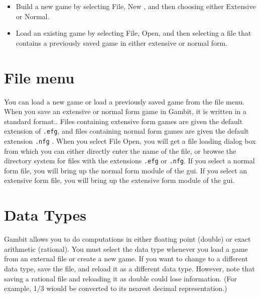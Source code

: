 \begin{itemize}
\item Build a new game by selecting File, New , and then choosing either 
Extensive or Normal.
\item  Load an existing game by selecting File, Open, and then selecting 
a file that contains a previously saved game in either extensive or normal form.
\end{itemize}

\section{File menu}
You can load a new game or load a previously saved game from the file 
menu.  When you save an extensive or normal form game in Gambit, it is 
written in a standard format..  Files containing extensive form games are
given the default extension of \verb+.efg+, and files containing normal
form games are given the default extension \verb+.nfg+ .  When you select
File Open, you will get a file loading dialog box from which you can
either directly enter the name of the file, or browse the directory system
for files with the extensions \verb+.efg+ or \verb+.nfg+.  If you select a
normal form file, you will bring up the normal form module of the gui.  If
you select an extensive form file, you will bring up the extensive form
module of the gui.

\section{Data Types}
Gambit allows you to do computations in either floating point (double) or
exact arithmetic (rational).  You must select the data type whenever you
load a game from an external file or create a new game.  If you want to
change to a different data type, save the file, and reload it as a
different data type.  However, note that saving a rational file and
reloading it as double could lose information.  (For example, 1/3 wiould
be converted to its nearest decimal representation.)

